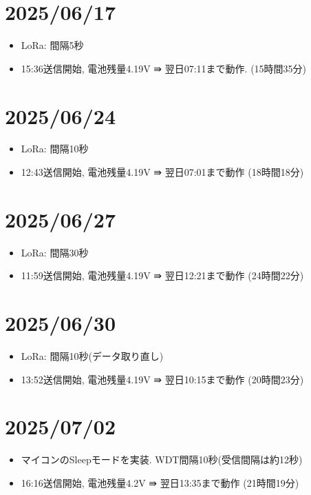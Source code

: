 \section{2025/06/17}
\begin{itemize}
    \item LoRa: 間隔5秒
    \item 15:36送信開始, 電池残量4.19V ⇛ 翌日07:11まで動作. (15時間35分)
\end{itemize}

\section{2025/06/24}
\begin{itemize}
    \item LoRa: 間隔10秒
    \item 12:43送信開始, 電池残量4.19V ⇛ 翌日07:01まで動作 (18時間18分)
\end{itemize}

\section{2025/06/27}
\begin{itemize}
    \item LoRa: 間隔30秒
    \item 11:59送信開始, 電池残量4.19V ⇛ 翌日12:21まで動作 (24時間22分)
\end{itemize}

\section{2025/06/30}
\begin{itemize}
    \item LoRa: 間隔10秒(データ取り直し)
    \item 13:52送信開始, 電池残量4.19V ⇛ 翌日10:15まで動作 (20時間23分)
\end{itemize}

\section{2025/07/02}
\begin{itemize}
    \item マイコンのSleepモードを実装. WDT間隔10秒(受信間隔は約12秒)
    \item 16:16送信開始, 電池残量4.2V ⇛ 翌日13:35まで動作 (21時間19分)
\end{itemize}

